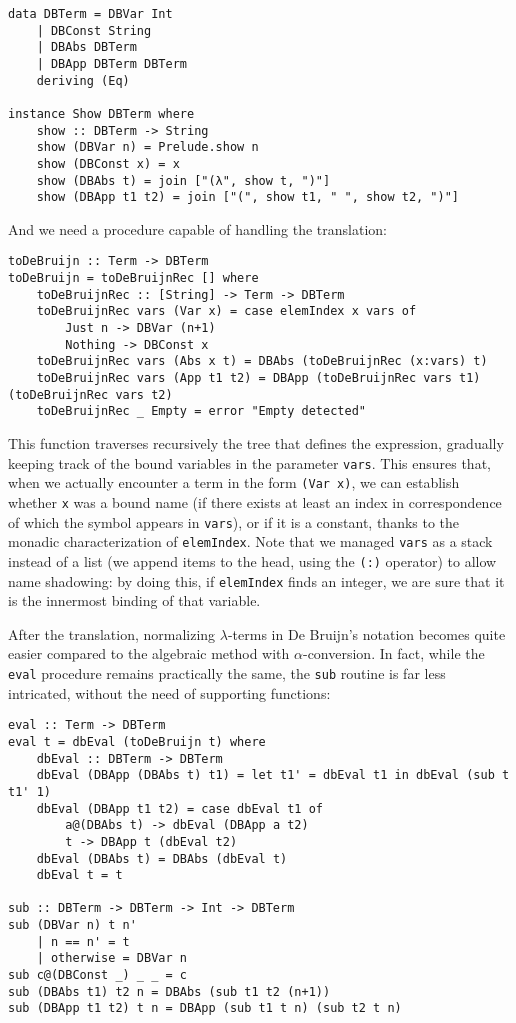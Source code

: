 \documentclass{article}
\begin{document}
\begin{lstlisting}
data DBTerm = DBVar Int
    | DBConst String
    | DBAbs DBTerm
    | DBApp DBTerm DBTerm
    deriving (Eq)

instance Show DBTerm where
    show :: DBTerm -> String
    show (DBVar n) = Prelude.show n
    show (DBConst x) = x
    show (DBAbs t) = join ["(λ", show t, ")"]
    show (DBApp t1 t2) = join ["(", show t1, " ", show t2, ")"]
\end{lstlisting}

And we need a procedure capable of handling the translation:

\begin{lstlisting}
toDeBruijn :: Term -> DBTerm
toDeBruijn = toDeBruijnRec [] where
    toDeBruijnRec :: [String] -> Term -> DBTerm
    toDeBruijnRec vars (Var x) = case elemIndex x vars of
        Just n -> DBVar (n+1)
        Nothing -> DBConst x
    toDeBruijnRec vars (Abs x t) = DBAbs (toDeBruijnRec (x:vars) t)
    toDeBruijnRec vars (App t1 t2) = DBApp (toDeBruijnRec vars t1) (toDeBruijnRec vars t2)
    toDeBruijnRec _ Empty = error "Empty detected"
\end{lstlisting}

This function traverses recursively the tree that defines the expression, gradually keeping track of the bound variables in the parameter \lstinline|vars|. This ensures that, when we actually encounter a term in the form \lstinline|(Var x)|, we can establish whether \lstinline|x| was a bound name (if there exists at least an index in correspondence of which the symbol appears in \lstinline|vars|), or if it is a constant, thanks to the monadic characterization of \lstinline|elemIndex|. Note that we managed \lstinline|vars| as a stack instead of a list (we append items to the head, using the \lstinline|(:)| operator) to allow name shadowing: by doing this, if \lstinline|elemIndex| finds an integer, we are sure that it is the innermost binding of that variable.

After the translation, normalizing $\lambda$-terms in De Bruijn's notation becomes quite easier compared to the algebraic method with $\alpha$-conversion. In fact, while the \lstinline|eval| procedure remains practically the same, the \lstinline|sub| routine is far less intricated, without the need of supporting functions:

\begin{lstlisting}
eval :: Term -> DBTerm
eval t = dbEval (toDeBruijn t) where
    dbEval :: DBTerm -> DBTerm
    dbEval (DBApp (DBAbs t) t1) = let t1' = dbEval t1 in dbEval (sub t t1' 1)
    dbEval (DBApp t1 t2) = case dbEval t1 of
        a@(DBAbs t) -> dbEval (DBApp a t2)
        t -> DBApp t (dbEval t2)
    dbEval (DBAbs t) = DBAbs (dbEval t)
    dbEval t = t

sub :: DBTerm -> DBTerm -> Int -> DBTerm
sub (DBVar n) t n'
    | n == n' = t
    | otherwise = DBVar n
sub c@(DBConst _) _ _ = c
sub (DBAbs t1) t2 n = DBAbs (sub t1 t2 (n+1))
sub (DBApp t1 t2) t n = DBApp (sub t1 t n) (sub t2 t n)
\end{lstlisting}
\end{document}
